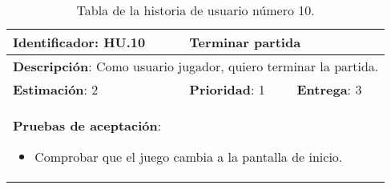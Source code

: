 \begin{table}[h]
  \begin{center}
    \begin{tabular}{|p{4cm}|p{4cm}|p{4cm}|}

    \hline
    \textbf{Identificador}: HU.10
    & \multicolumn{2}{p{8cm}|}{Terminar partida}\\

    \hline
    \multicolumn{3}{|p{12cm}|}{\textbf{Descripción}: Como usuario jugador, quiero terminar la partida.}\\

    \hline
    \textbf{Estimación}: 2
    & \textbf{Prioridad}: 1
    & \textbf{Entrega}: 3\\

    \hline
    \multicolumn{3}{|p{12cm}|}{\textbf{Pruebas de aceptación}:
      \begin{itemize}
        \item Comprobar que el juego cambia a la pantalla de inicio.
      \end{itemize}
    }\\

    \hline

    \end{tabular}

    \caption{Tabla de la historia de usuario número 10.}
    \label{tabla-hu10}

  \end{center}
\end{table}

